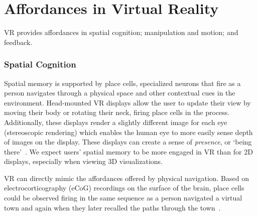 \documentclass[conference]{IEEEtran}
\begin{document}
\section{Affordances in Virtual Reality}
VR provides affordances in spatial cognition; manipulation and motion; and feedback.

\subsubsection{Spatial Cognition}
Spatial memory is supported by place cells, specialized neurons that fire as a person navigates through a physical space and other contextual cues in the environment.  
Head-mounted VR displays allow the user to update their view by moving their body or rotating their neck, firing place cells in the process.
Additionally, these displays render a slightly different image for each eye (stereoscopic rendering) which enables the human eye to more easily sense depth of images on the display.
These displays can create a sense of \emph{presence}, or `being there'~\cite{Slater:PlaceInVR}.
We expect users' spatial memory to be more engaged in VR than for 2D displays, especially when viewing 3D visualizations.


VR can directly mimic the affordances offered by physical navigation. Based on electrocorticography (eCoG) recordings on the surface of the brain, place cells could be observed firing in the same sequence as a person navigated a virtual town and again when they later recalled the paths through the town~\cite{Ekstrom:2003}.


\end{document}

